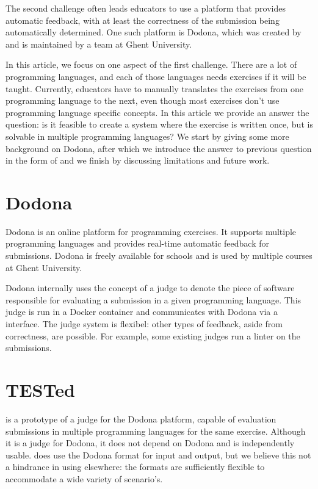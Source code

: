 \documentclass[5p,number]{elsarticle}
\begin{document}
    The second challenge often leads educators to use a platform that provides automatic feedback, with at least the correctness of the submission being automatically determined.
    One such platform is Dodona, which was created by and is maintained by a team at Ghent University.
    
    In this article, we focus on one aspect of the first challenge.
    There are a lot of programming languages, and each of those languages needs exercises if it will be taught.
    Currently, educators have to manually translates the exercises from one programming language to the next, even though most exercises don't use programming language specific concepts.
    In this article we provide an answer the question: is it feasible to create a system where the exercise is written once, but is solvable in multiple programming languages?
    We start by giving some more background on Dodona, after which we introduce the answer to previous question in the form of \tested{} and we finish by discussing limitations and future work.

    \section{Dodona}\label{sec:extended-dodona}

    Dodona is an online platform for programming exercises.
    It supports multiple programming languages and provides real-time automatic feedback for submissions.
    Dodona is freely available for schools and is used by multiple courses at Ghent University.

    Dodona internally uses the concept of a judge to denote the piece of software responsible for evaluating a submission in a given programming language.
    This judge is run in a Docker container and communicates with Dodona via a  interface.
    The judge system is flexibel: other types of feedback, aside from correctness, are possible.
    For example, some existing judges run a linter on the submissions.

    \section{TESTed}\label{sec:extended-test}

    \tested{} is a prototype of a judge for the Dodona platform, capable of evaluation submissions in multiple programming languages for the same exercise.
    Although it is a judge for Dodona, it does not depend on Dodona and is independently usable.
    \tested{} does use the Dodona format for input and output, but we believe this not a hindrance in using \tested{} elsewhere: the formats are sufficiently flexible to accommodate a wide variety of scenario's.
    
\end{document}
